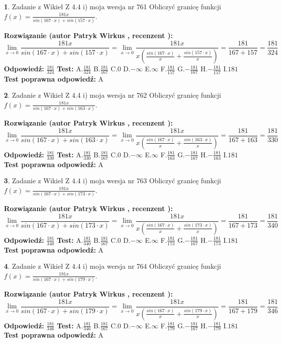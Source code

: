 \documentclass[12pt, a4paper]{article}
\theoremstyle{definition} %
\newtheorem{zad}{}
\newcommand{\zadStart}[1]{\begin{zad}#1\newline}
\newcommand{\zadStop}{\end{zad}}
\newcommand{\rozwStart}[2]{\noindent \textbf{Rozwiązanie (autor #1 , recenzent #2): }\newline}
\newcommand{\rozwStop}{\newline}
\newcommand{\odpStart}{\noindent \textbf{Odpowiedź:}\newline}
\newcommand{\odpStop}{\newline}
\newcommand{\testStart}{\noindent \textbf{Test:}\newline}
\newcommand{\testStop}{\newline}
\newcommand{\kluczStart}{\noindent \textbf{Test poprawna odpowiedź:}\newline}
\newcommand{\kluczStop}{\newline}
\begin{document}
\zadStart{Zadanie z Wikieł Z 4.4 i) moja wersja nr 761}
Obliczyć granicę funkcji $f(x)=\frac{181x}{sin(167\cdot x) +sin(157\cdot x)}$.
\zadStop
\rozwStart{Patryk Wirkus}{}
$$\lim\limits_{x\to 0}\frac{181x}{sin(167\cdot x) +sin(157\cdot x)}=\lim\limits_{x\to 0}\frac{181x}{x(\frac{sin(167\cdot x)}{x}+\frac{sin(157\cdot x)}{x})}=\frac{181}{167+157} = \frac{181}{324}$$
\rozwStop
\odpStart
$\frac{181}{324}$
\odpStop
\testStart
A.$\frac{181}{324}$
B.$\frac{181}{167}$
C.$0$
D.$-\infty$
E.$\infty$
F.$\frac{181}{157}$
G.$-\frac{181}{167}$
H.$-\frac{181}{157}$
I.$181$
\testStop
\kluczStart
A
\kluczStop



\zadStart{Zadanie z Wikieł Z 4.4 i) moja wersja nr 762}
Obliczyć granicę funkcji $f(x)=\frac{181x}{sin(167\cdot x) +sin(163\cdot x)}$.
\zadStop
\rozwStart{Patryk Wirkus}{}
$$\lim\limits_{x\to 0}\frac{181x}{sin(167\cdot x) +sin(163\cdot x)}=\lim\limits_{x\to 0}\frac{181x}{x(\frac{sin(167\cdot x)}{x}+\frac{sin(163\cdot x)}{x})}=\frac{181}{167+163} = \frac{181}{330}$$
\rozwStop
\odpStart
$\frac{181}{330}$
\odpStop
\testStart
A.$\frac{181}{330}$
B.$\frac{181}{167}$
C.$0$
D.$-\infty$
E.$\infty$
F.$\frac{181}{163}$
G.$-\frac{181}{167}$
H.$-\frac{181}{163}$
I.$181$
\testStop
\kluczStart
A
\kluczStop



\zadStart{Zadanie z Wikieł Z 4.4 i) moja wersja nr 763}
Obliczyć granicę funkcji $f(x)=\frac{181x}{sin(167\cdot x) +sin(173\cdot x)}$.
\zadStop
\rozwStart{Patryk Wirkus}{}
$$\lim\limits_{x\to 0}\frac{181x}{sin(167\cdot x) +sin(173\cdot x)}=\lim\limits_{x\to 0}\frac{181x}{x(\frac{sin(167\cdot x)}{x}+\frac{sin(173\cdot x)}{x})}=\frac{181}{167+173} = \frac{181}{340}$$
\rozwStop
\odpStart
$\frac{181}{340}$
\odpStop
\testStart
A.$\frac{181}{340}$
B.$\frac{181}{167}$
C.$0$
D.$-\infty$
E.$\infty$
F.$\frac{181}{173}$
G.$-\frac{181}{167}$
H.$-\frac{181}{173}$
I.$181$
\testStop
\kluczStart
A
\kluczStop



\zadStart{Zadanie z Wikieł Z 4.4 i) moja wersja nr 764}
Obliczyć granicę funkcji $f(x)=\frac{181x}{sin(167\cdot x) +sin(179\cdot x)}$.
\zadStop
\rozwStart{Patryk Wirkus}{}
$$\lim\limits_{x\to 0}\frac{181x}{sin(167\cdot x) +sin(179\cdot x)}=\lim\limits_{x\to 0}\frac{181x}{x(\frac{sin(167\cdot x)}{x}+\frac{sin(179\cdot x)}{x})}=\frac{181}{167+179} = \frac{181}{346}$$
\rozwStop
\odpStart
$\frac{181}{346}$
\odpStop
\testStart
A.$\frac{181}{346}$
B.$\frac{181}{167}$
C.$0$
D.$-\infty$
E.$\infty$
F.$\frac{181}{179}$
G.$-\frac{181}{167}$
H.$-\frac{181}{179}$
I.$181$
\testStop
\kluczStart
A
\kluczStop
\end{document}
